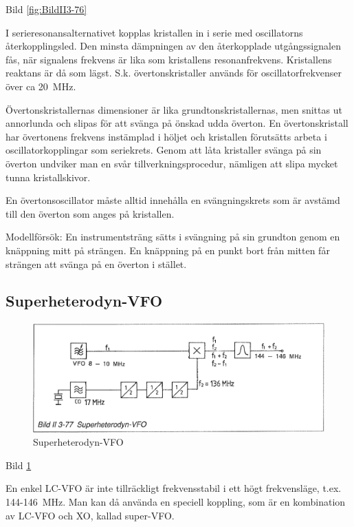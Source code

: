 Bild \ref{fig:BildII3-76}

I serieresonansalternativet kopplas kristallen in i serie med
oscillatorns återkopplingsled. Den minsta dämpningen av den
återkopplade utgångssignalen fås, när signalens frekvens är lika som
kristallens resonanfrekvens. Kristallens reaktans är då som
lägst. S.k. övertonskristaller används för oscillatorfrekvenser över
ca 20~MHz.

Övertonskristallernas dimensioner är lika grundtonskristallernas, men
snittas ut annorlunda och slipas för att svänga på önskad udda
överton. En övertonskristall har övertonens frekvens instämplad i
höljet och kristallen förutsätts arbeta i oscillatorkopplingar som
seriekrets. Genom att låta kristaller svänga på sin överton undviker
man en svår tillverkningsprocedur, nämligen att slipa mycket tunna
kristallskivor.

En övertonsoscillator måste alltid innehålla en svängningskrets som är
avstämd till den överton som anges på kristallen.

Modellförsök: En instrumentsträng sätts i svängning på sin grundton
genom en knäppning mitt på strängen. En knäppning på en punkt bort
från mitten får strängen att svänga på en överton i stället.

\subsection{Superheterodyn-VFO}

\begin{figure}
\includegraphics[width=\textwidth]{images/bild_2_3-77}
\caption{Superheterodyn-VFO}
\label{fig:BildII3-77}
\end{figure}

Bild \ref{fig:BildII3-77}

En enkel LC-VFO är inte tillräckligt frekvensstabil i ett högt
frekvensläge, t.ex. 144-146~MHz. Man kan då använda en speciell
koppling, som är en kombination av LC-VFO och XO, kallad super-VFO.

